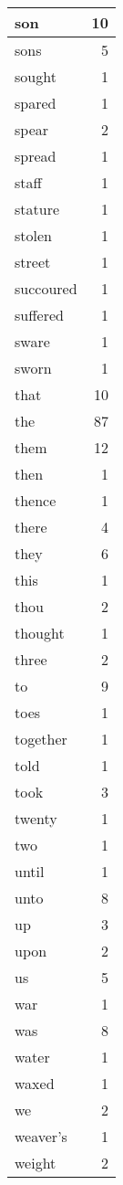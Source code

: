 \begin{center}
\begin{longtable}{l|r}
son & 10 \\ \hline
sons & 5 \\ \hline
sought & 1 \\ \hline
spared & 1 \\ \hline
spear & 2 \\ \hline
spread & 1 \\ \hline
staff & 1 \\ \hline
stature & 1 \\ \hline
stolen & 1 \\ \hline
street & 1 \\ \hline
succoured & 1 \\ \hline
suffered & 1 \\ \hline
sware & 1 \\ \hline
sworn & 1 \\ \hline
that & 10 \\ \hline
the & 87 \\ \hline
them & 12 \\ \hline
then & 1 \\ \hline
thence & 1 \\ \hline
there & 4 \\ \hline
they & 6 \\ \hline
this & 1 \\ \hline
thou & 2 \\ \hline
thought & 1 \\ \hline
three & 2 \\ \hline
to & 9 \\ \hline
toes & 1 \\ \hline
together & 1 \\ \hline
told & 1 \\ \hline
took & 3 \\ \hline
twenty & 1 \\ \hline
two & 1 \\ \hline
until & 1 \\ \hline
unto & 8 \\ \hline
up & 3 \\ \hline
upon & 2 \\ \hline
us & 5 \\ \hline
war & 1 \\ \hline
was & 8 \\ \hline
water & 1 \\ \hline
waxed & 1 \\ \hline
we & 2 \\ \hline
weaver's & 1 \\ \hline
weight & 2 \\ \hline

\end{longtable}
\end{center}
